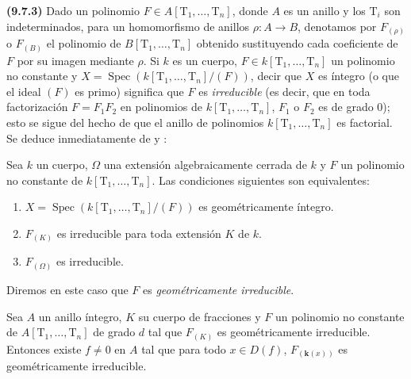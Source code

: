\textbf{(9.7.3)}
\label{IV.9.7.3}
Dado un polinomio $F\in A[\mathrm T_1,\ldots,\mathrm T_n]$, donde $A$ es un anillo y los $\mathrm T_i$ son indeterminados, para un homomorfismo de anillos $\rho:A\to B$, denotamos por $F_{(\rho)}$ o $F_{(B)}$ el polinomio de $B[\mathrm T_1,\ldots,\mathrm T_n]$ obtenido sustituyendo cada coeficiente de $F$ por su imagen mediante $\rho$.
Si $k$ es un cuerpo, $F\in k[\mathrm T_1,\ldots,\mathrm T_n]$ un polinomio no constante y $X=\operatorname{Spec}(k[\mathrm T_1,\ldots,\mathrm T_n]/(F))$, decir que $X$ es íntegro (o que el ideal $(F)$ es primo) significa que $F$ es \emph{irreducible} (es decir, que en toda factorización $F=F_1F_2$ en polinomios de $k[\mathrm T_1,\ldots,\mathrm T_n]$, $F_1$ o $F_2$ es de grado $0$); esto se sigue del hecho de que el anillo de polinomios $k[\mathrm T_1,\ldots,\mathrm T_n]$ es factorial.
Se deduce inmediatamente de  y :

\begin{lemma}[9.7.4]
\label{IV.9.7.4}
Sea $k$ un cuerpo, $\Omega$ una extensión algebraicamente cerrada de $k$ y $F$ un polinomio no constante de $k[\mathrm T_1,\ldots,\mathrm T_n]$.
Las condiciones siguientes son equivalentes:
\begin{enumerate}[label=\alph*)]
  \item $X=\operatorname{Spec}(k[\mathrm T_1,\ldots,\mathrm T_n]/(F))$ es geométricamente íntegro.
  \item $F_{(K)}$ es irreducible para toda extensión $K$ de $k$.
  \item $F_{(\Omega)}$ es irreducible.
\end{enumerate}
\end{lemma}

Diremos en este caso que $F$ es \emph{geométricamente irreducible}.

\begin{lemma}[9.7.5]
\label{IV.9.7.5}
Sea $A$ un anillo íntegro, $K$ su cuerpo de fracciones y $F$ un polinomio no constante de $A[\mathrm T_1,\ldots,\mathrm T_n]$ de grado $d$ tal que $F_{(K)}$ es geométricamente irreducible.
Entonces existe $f\neq0$ en $A$ tal que para todo $x\in D(f)$, $F_{(\mathbf{k}(x))}$ es geométricamente irreducible.
\end{lemma}

